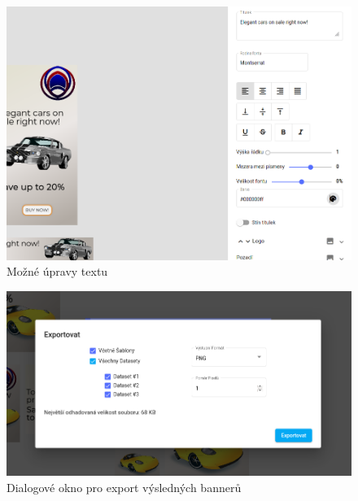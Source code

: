 \documentclass[czech,bachelor]{diploma}
\begin{document}
\begin{figure}[h]
    \includegraphics[width=1.0\textwidth]{Figures/editor/uprava-textu.png}
    \caption{Možné úpravy textu}
    \label{fig:editor:text-edit}
\end{figure}


\begin{figure}[h]
    \includegraphics[width=1.0\textwidth]{Figures/editor/export-dialog.png}
    \caption{Dialogové okno pro export výsledných bannerů}
    \label{fig:editor:exporting}
\end{figure}
\end{document}
